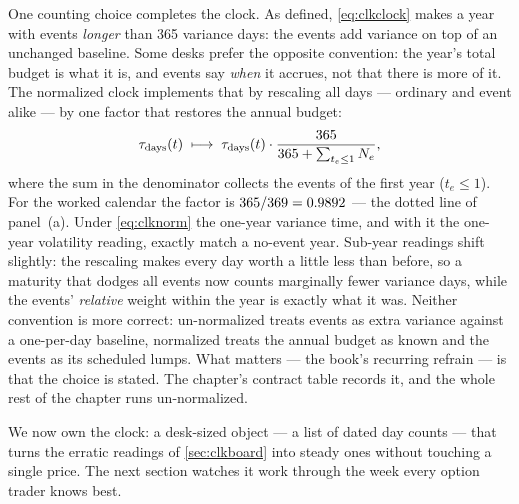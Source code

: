 One counting choice completes the clock.  As defined,
\eqref{eq:clkclock} makes a year with events \emph{longer} than 365
variance days: the events add variance on top of an unchanged
baseline.  Some desks prefer the opposite convention: the year's
total budget is what it is, and events say \emph{when} it accrues,
not that there is more of it.  The normalized clock implements that
by rescaling all days --- ordinary and event alike --- by one factor
that restores the annual budget:
\begin{equation}
\tau_{\rm days}(t)\;\longmapsto\;
\tau_{\rm days}(t)\cdot
\frac{365}{365+\sum_{t_e\le1}N_e},
\label{eq:clknorm}
\end{equation}
where the sum in the denominator collects the events of the first
year ($t_e\le1$).  For the worked calendar the factor is
$365/369=0.9892$ --- the dotted line of
panel~(a).  Under \eqref{eq:clknorm} the one-year variance time, and
with it the one-year volatility reading, exactly match a no-event
year.  Sub-year readings shift slightly: the rescaling makes every
day worth a little less than before, so a maturity that dodges all
events now counts marginally fewer variance days, while the events'
\emph{relative} weight within the year is exactly what it was.
Neither convention is more correct:
un-normalized treats events as extra variance against a
one-per-day baseline, normalized treats the annual budget as known
and the events as its scheduled lumps.  What matters --- the book's
recurring refrain --- is that the choice is stated.  The chapter's
contract table records it, and the whole rest of the chapter runs
un-normalized.

We now own the clock: a desk-sized object --- a list of dated day
counts --- that turns the erratic readings of \cref{sec:clkboard}
into steady ones without touching a single price.  The next section
watches it work through the week every option trader knows best.
